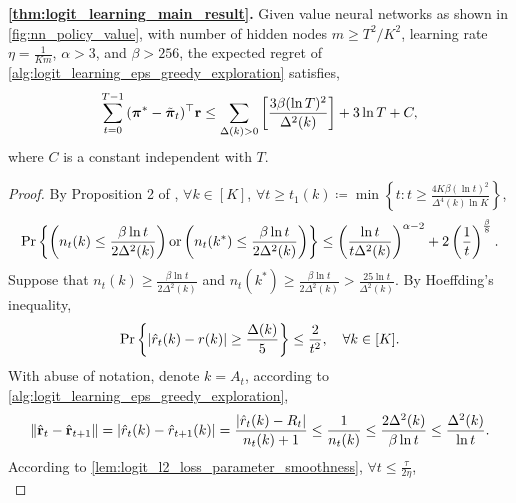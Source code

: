 \textbf{\cref{thm:logit_learning_main_result}.} Given value neural networks as shown in \cref{fig:nn_policy_value}, with number of hidden nodes $m \ge T^2 / K^2$, learning rate $\eta = \frac{1}{K m}$,  $\alpha > 3$, and $\beta > 256$, the expected regret of \cref{alg:logit_learning_eps_greedy_exploration} satisfies,
\begin{equation*}
\begin{split}
    \sum\limits_{t=0}^{T-1}{ ( {{\boldsymbol{\pi}}^*} - \tilde{{\boldsymbol{\pi}}}_t)^\top {\mathbf{r}} } \le \sum\limits_{\Delta(k) > 0}{ \left[ \frac{ 3 \beta ( \ln{T} )^2}{\Delta^2(k)} \right] }  + 3 \ln{T} + C,
\end{split}
\end{equation*}
where $C$ is a constant independent with $T$.
\begin{proof}
	By Proposition 2 of \citet{seldin2017improved}, $\forall k \in [K]$, $\forall t \ge t_1(k) \coloneqq \min{\left\{ t : t \ge \frac{4 K \beta (\ln{t})^2}{\Delta^4(k) \ln{K}} \right\}}$,
	\begin{equation*}
	\begin{split}
	\operatorname*{Pr}{\left\{ \left( n_t(k) \le \frac{\beta \ln{t}}{2 \Delta^2(k)} \right) \text{or} \left( n_t(k^*) \le \frac{\beta \ln{t}}{2 \Delta^2(k)} \right) \right\}} \le \left( \frac{\ln{t}}{t \Delta^2(k)} \right)^{\alpha - 2} + 2 \left(\frac{1}{t}\right)^{\frac{\beta}{8}}.
	\end{split}
	\end{equation*}
	Suppose that $n_t(k) \ge \frac{\beta \ln{t}}{2 \Delta^2(k)}$ and $n_t(k^*) \ge \frac{\beta \ln{t}}{2 \Delta^2(k)} > \frac{25 \ln{t}}{\Delta^2(k)}$. By Hoeffding's inequality,
	\begin{equation*}
	    \operatorname*{Pr}{\left\{ | \hat{r}_t(k) - r(k) | \ge \frac{\Delta(k)}{5} \right\}} \le \frac{2}{t^2}, \quad \forall k \in [K].
	\end{equation*}
	With abuse of notation, denote $k = A_t$, according to \cref{alg:logit_learning_eps_greedy_exploration},
	\begin{equation*}
	\begin{split}
	    \| \hat{{\mathbf{r}}}_t - \hat{{\mathbf{r}}}_{t+1} \| = | \hat{r}_t(k) - \hat{r}_{t+1}(k) | = \frac{| \hat{r}_t(k) - R_t |}{n_t(k) + 1} \le \frac{1}{n_t(k)} \le \frac{2 \Delta^2(k)}{\beta \ln{t}} \le \frac{\Delta^2(k)}{\ln{t}}.
	\end{split}
	\end{equation*}
	According to \cref{lem:logit_l2_loss_parameter_smoothness}, $\forall t \le \frac{\tau}{2 \eta}$,
	\begin{equation*}

\end{equation*}
\end{proof}
